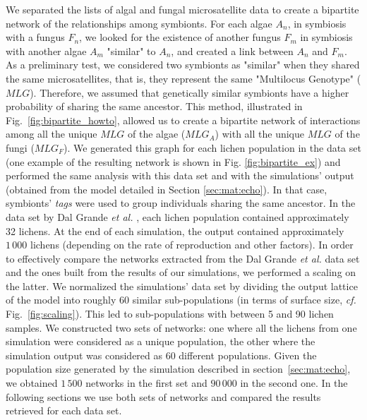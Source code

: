 \documentclass[fleqn,10pt]{wlscirep}
\begin{document}
We separated the lists of algal and fungal microsatellite data \cite{dal2012vertical} to create a bipartite network of the relationships among symbionts. For each algae $A_n$, in symbiosis with a fungus $F_n$, we looked for the existence of another fungus $F_m$ in symbiosis with another algae $A_m$ "similar" to  $A_n$, and created a link between $A_n$ and $F_m$. As a preliminary test, we considered two symbionts as "similar" when they shared the same microsatellites, that is, they represent the same "Multilocus Genotype" ($MLG$). Therefore, we assumed that genetically similar symbionts have a higher probability of sharing the same ancestor. This method, illustrated in Fig.~\ref{fig:bipartite_howto}, allowed us to create a bipartite network of interactions among all the unique $MLG$ of the algae ($MLG_A$) with all the unique $MLG$ of the fungi ($MLG_F$). We generated this graph for each lichen population in the  data set\cite{dal2012vertical} (one example of the resulting network is shown in Fig. \ref{fig:bipartite_ex}) and performed the same analysis with this data set and with the simulations' output (obtained from the model detailed in Section \ref{sec:mat:echo}). In that case, symbionts' \emph{tags} were used to group individuals sharing the same ancestor. 
In the data set by Dal Grande \emph{et al.} \cite{dal2012vertical}, each lichen population contained approximately 32 lichens. At the end of each simulation, the output contained approximately $1\,000$ lichens (depending on the rate of reproduction and other factors). In order to effectively compare the networks extracted from the Dal Grande \emph{et al.} data set\cite{dal2012vertical} and the ones built from the results of our simulations, we performed a scaling on the latter. We normalized the simulations' data set by dividing the output lattice of the model into roughly 60 similar sub-populations (in terms of surface size, \emph{cf.} Fig.~\ref{fig:scaling}). This led to sub-populations with between 5 and 90 lichen samples. We constructed two sets of networks: one where all the lichens from one simulation were considered as a unique population, the other where the simulation output was considered as 60 different populations. Given the population size generated by the simulation described in section~\ref{sec:mat:echo}, we obtained $1\,500$ networks in the first set and $90\,000$ in the second one. In the following sections we use both sets of networks and compared the results retrieved for each data set.
\end{document}

